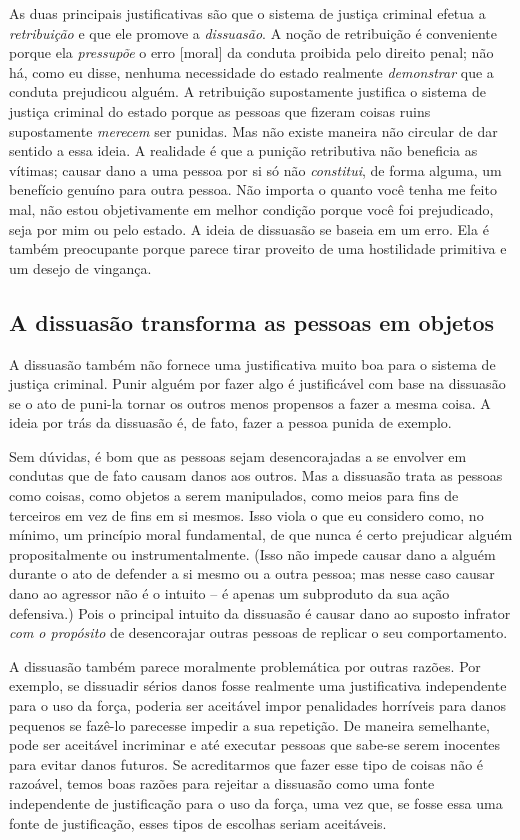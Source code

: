 As duas principais justificativas são que o sistema de justiça criminal efetua a \emph{retribuição} e que ele promove a \emph{dissuasão}. A noção de retribuição é conveniente porque ela \emph{pressupõe} o erro [moral] da conduta proibida pelo direito penal; não há, como eu disse, nenhuma necessidade do estado realmente \emph{demonstrar} que a conduta prejudicou alguém. A retribuição supostamente justifica o sistema de justiça criminal do estado porque as pessoas que fizeram coisas ruins supostamente \emph{merecem} ser punidas. Mas não existe maneira não circular de dar sentido a essa ideia. A realidade é que a punição retributiva não beneficia as vítimas; causar dano a uma pessoa por si só não \emph{constitui}, de forma alguma, um benefício genuíno para outra pessoa. Não importa o quanto você tenha me feito mal, não estou objetivamente em melhor condição porque você foi prejudicado, seja por mim ou pelo estado. A ideia de dissuasão se baseia em um erro. Ela é também preocupante porque parece tirar proveito de uma hostilidade primitiva e um desejo de vingança.

\subsection*{A dissuasão transforma as pessoas em objetos}

A dissuasão também não fornece uma justificativa muito boa para o sistema de justiça criminal. Punir alguém por fazer algo é justificável com base na dissuasão se o ato de puni-la tornar os outros menos propensos a fazer a mesma coisa. A ideia por trás da dissuasão é, de fato, fazer a pessoa punida de exemplo.

Sem dúvidas, é bom que as pessoas sejam desencorajadas a se envolver em condutas que de fato causam danos aos outros. Mas a dissuasão trata as pessoas como coisas, como objetos a serem manipulados, como meios para fins de terceiros em vez de fins em si mesmos. Isso viola o que eu considero como, no mínimo, um princípio moral fundamental, de que nunca é certo prejudicar alguém propositalmente ou instrumentalmente. (Isso não impede causar dano a alguém durante o ato de defender a si mesmo ou a outra pessoa; mas nesse caso causar dano ao agressor não é o intuito -- é apenas um subproduto da sua ação defensiva.) Pois o principal intuito da dissuasão é causar dano ao suposto infrator \emph{com o propósito} de desencorajar outras pessoas de replicar o seu comportamento.

A dissuasão também parece moralmente problemática por outras razões. Por exemplo, se dissuadir sérios danos fosse realmente uma justificativa independente para o uso da força, poderia ser aceitável impor penalidades horríveis para danos pequenos se fazê-lo parecesse impedir a sua repetição. De maneira semelhante, pode ser aceitável incriminar e até executar pessoas que sabe-se serem inocentes para evitar danos futuros. Se acreditarmos que fazer esse tipo de coisas não é razoável, temos boas razões para rejeitar a dissuasão como uma fonte independente de justificação para o uso da força, uma vez que, se fosse essa uma fonte de justificação, esses tipos de escolhas seriam aceitáveis.

